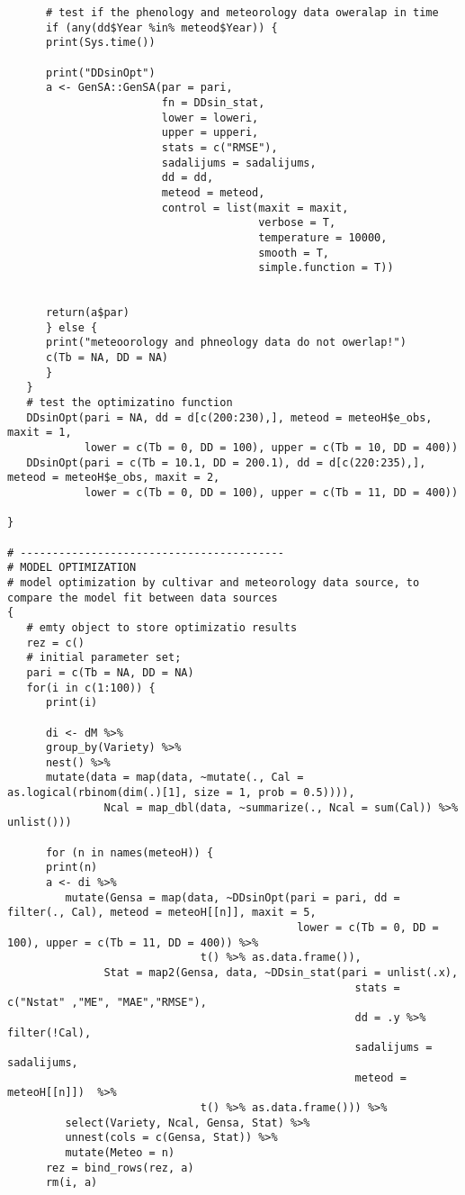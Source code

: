 \begin{verbatim}
      # test if the phenology and meteorology data oweralap in time
      if (any(dd$Year %in% meteod$Year)) {
      print(Sys.time())

      print("DDsinOpt")
      a <- GenSA::GenSA(par = pari,
                        fn = DDsin_stat,
                        lower = loweri,
                        upper = upperi,
                        stats = c("RMSE"),
                        sadalijums = sadalijums,
                        dd = dd,
                        meteod = meteod,
                        control = list(maxit = maxit,
                                       verbose = T,
                                       temperature = 10000,
                                       smooth = T,
                                       simple.function = T))


      return(a$par)
      } else {
      print("meteoorology and phneology data do not owerlap!")
      c(Tb = NA, DD = NA)
      }
   }
   # test the optimizatino function
   DDsinOpt(pari = NA, dd = d[c(200:230),], meteod = meteoH$e_obs, maxit = 1,
            lower = c(Tb = 0, DD = 100), upper = c(Tb = 10, DD = 400))
   DDsinOpt(pari = c(Tb = 10.1, DD = 200.1), dd = d[c(220:235),], meteod = meteoH$e_obs, maxit = 2,
            lower = c(Tb = 0, DD = 100), upper = c(Tb = 11, DD = 400))

}

# -----------------------------------------
# MODEL OPTIMIZATION
# model optimization by cultivar and meteorology data source, to compare the model fit between data sources
{
   # emty object to store optimizatio results
   rez = c()
   # initial parameter set;
   pari = c(Tb = NA, DD = NA)
   for(i in c(1:100)) {
      print(i)

      di <- dM %>%
      group_by(Variety) %>%
      nest() %>%
      mutate(data = map(data, ~mutate(., Cal = as.logical(rbinom(dim(.)[1], size = 1, prob = 0.5)))),
               Ncal = map_dbl(data, ~summarize(., Ncal = sum(Cal)) %>% unlist()))

      for (n in names(meteoH)) {
      print(n)
      a <- di %>%
         mutate(Gensa = map(data, ~DDsinOpt(pari = pari, dd = filter(., Cal), meteod = meteoH[[n]], maxit = 5,
                                             lower = c(Tb = 0, DD = 100), upper = c(Tb = 11, DD = 400)) %>%
                              t() %>% as.data.frame()),
               Stat = map2(Gensa, data, ~DDsin_stat(pari = unlist(.x),
                                                      stats = c("Nstat" ,"ME", "MAE","RMSE"),
                                                      dd = .y %>% filter(!Cal),
                                                      sadalijums = sadalijums,
                                                      meteod = meteoH[[n]])  %>%
                              t() %>% as.data.frame())) %>%
         select(Variety, Ncal, Gensa, Stat) %>%
         unnest(cols = c(Gensa, Stat)) %>%
         mutate(Meteo = n)
      rez = bind_rows(rez, a)
      rm(i, a)


\end{verbatim}
